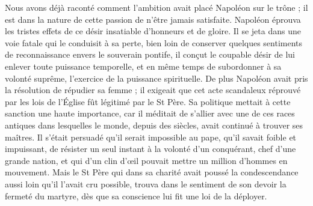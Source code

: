 Nous avons déjà raconté comment l'ambition avait placé Napoléon sur le trône ; il est dans la nature de cette passion de n'être jamais satisfaite. Napoléon éprouva les tristes effets de ce désir insatiable d'honneurs et de gloire. Il se jeta dans une voie fatale qui le conduisit à sa perte, bien loin de conserver
quelques sentiments de reconnaissance envers le souverain pontife, il conçut le coupable désir de lui enlever toute puissance temporelle, et en même temps de subordonner à sa volonté suprême, l'exercice de la puissance spirituelle. De plus Napoléon avait pris la résolution de répudier sa femme ; il exigeait que cet acte scandaleux réprouvé par les lois de l'Église fût légitimé par le St Père. Sa politique mettait à cette sanction une haute importance, car il méditait de s'allier avec une de ces races antiques dans lesquelles le monde, depuis des siècles, avait continué à trouver ses maîtres. Il s'était persuadé qu'il serait impossible au pape, qu'il savait foible et impuissant, de résister un seul instant à la volonté d'un conquérant, chef d'une grande nation, et qui d'un clin d'œil pouvait mettre un million d'hommes en mouvement. Mais le St Père qui dans sa charité avait poussé la condescendance aussi loin qu'il l'avait cru possible, trouva dans le sentiment de son devoir la fermeté du martyre, dès que sa conscience lui fit une loi de la déployer.


